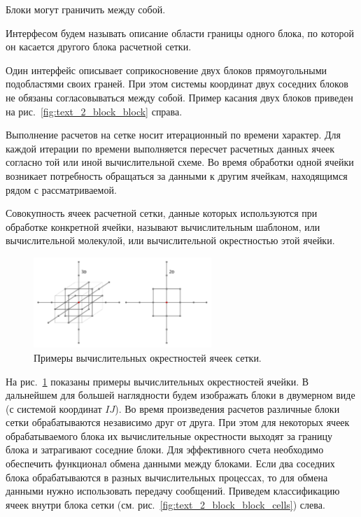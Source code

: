 Блоки могут граничить между собой.

\begin{definition}
Интерфесом будем называть описание области границы одного блока, по которой он касается другого блока расчетной сетки.
\end{definition}

Один интерфейс описывает соприкосновение двух блоков прямоугольными подобластями своих граней.
При этом системы координат двух соседних блоков не обязаны согласовываться между собой.
Пример касания двух блоков приведен на рис.~\ref{fig:text_2_block_block} справа.

Выполнение расчетов на сетке носит итерационный по времени характер.
Для каждой итерации по времени выполняется пересчет расчетных данных ячеек согласно той или иной вычислительной схеме.
Во время обработки одной ячейки возникает потребность обращаться за данными к другим ячейкам, находящимся рядом с рассматриваемой.

\begin{definition}
Совокупность ячеек расчетной сетки, данные которых используются при обработке конкретной ячейки, называют вычислительным шаблоном, или вычислительной молекулой, или вычислительной окрестностью этой ячейки.
\end{definition}

\begin{figure}[ht]
\centering
\includegraphics[width=0.6\textwidth]{fig/par_3-cell-delta.pdf}
\singlespacing
{}\caption{Примеры вычислительных окрестностей ячеек сетки.}
\label{fig:text_2_block_cell_delta}
\end{figure}

На рис.~\ref{fig:text_2_block_cell_delta} показаны примеры вычислительных окрестностей ячейки.
В дальнейшем для большей наглядности будем изображать блоки в двумерном виде (с системой координат $IJ$).
Во время произведения расчетов различные блоки сетки обрабатываются независимо друг от друга.
При этом для некоторых ячеек обрабатываемого блока их вычислительные окрестности выходят за границу блока и затрагивают соседние блоки.
Для эффективного счета необходимо обеспечить функционал обмена данными между блоками.
Если два соседних блока обрабатываются в разных вычислительных процессах, то для обмена данными нужно использовать передачу сообщений.
Приведем классификацию ячеек внутри блока сетки (см. рис.~\ref{fig:text_2_block_block_cells}) слева.

